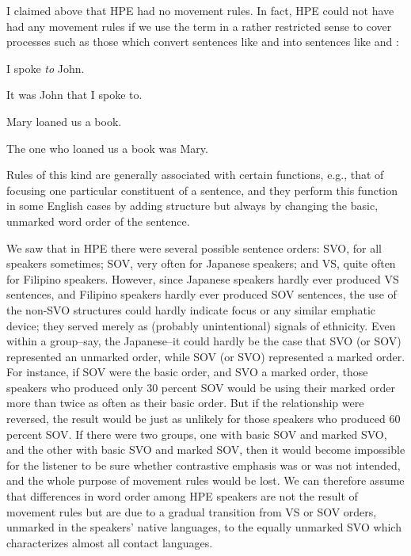 I claimed above that HPE had no movement rules. In fact, HPE could not have had any movement rules if we use the term in a rather restricted sense to cover processes such as those which convert sentences like  and  into sentences like  and :

\ea\label{ex:17}
 I spoke \textit{to} John.
\z

\ea\label{ex:18}
 It was John that I spoke to.
\glt 
\z

\ea\label{ex:19}
 Mary loaned us a book.
\glt 
\z

\ea\label{ex:20}
 The one who loaned us a book was Mary.
\glt 
\z

Rules of this kind are generally associated with certain functions, e.g.,
that of focusing one particular constituent of a sentence, and they perform this function in some English cases by adding structure but always by changing the basic, unmarked word order of the sentence.

We saw that in HPE there were several possible sentence orders: SVO, for all speakers sometimes; SOV, very often for Japanese speak\-ers; and VS, quite often for Filipino speakers. However, since Japanese speakers hardly ever produced VS sentences, and Filipino speakers hardly ever produced SOV sentences, the use of the non-SVO structures could hardly indicate focus or any similar emphatic device; they served merely as (probably unintentional) signals of ethnicity. Even within a group--say, the Japanese--it could hardly be the case that SVO (or SOV) represented an unmarked order, while SOV (or SVO) represented a marked order. For instance, if SOV were the basic order, and SVO a marked order, those speakers who produced only 30 percent SOV would be using their marked order more than twice as often as their basic order. But if the relationship were reversed, the result would be just as unlikely for those speakers who produced 60 percent SOV. If there were two groups, one with basic SOV and marked SVO, and the other with basic SVO and marked SOV, then it would become impossible for the listener to be sure whether contrastive emphasis was or was not intended, and the whole purpose of movement rules would be lost. We can therefore assume that differences in word order among HPE speakers are not the result of movement rules but are due to a gradual transition from VS or SOV orders, unmarked in the speakers' native languages, to the equally unmarked SVO which characterizes almost all contact languages.


